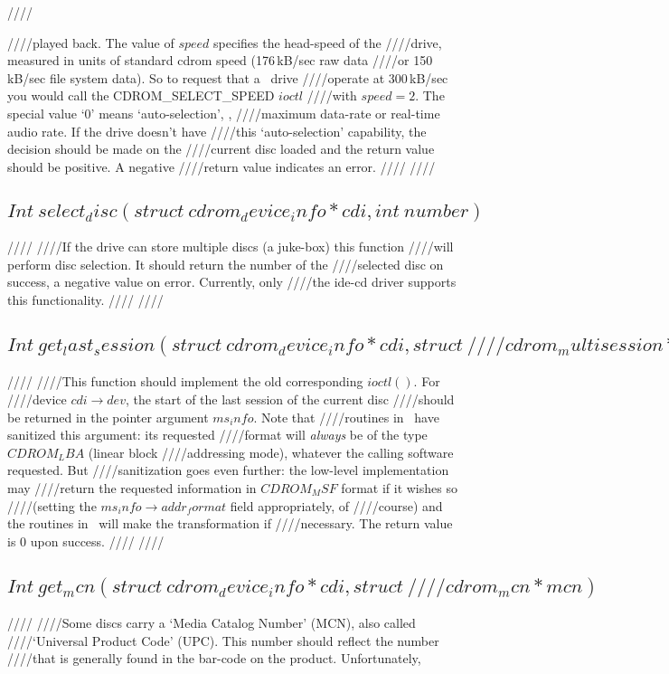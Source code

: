 ////\documentclass{article}
\begin{document}
////played back. The value of $speed$ specifies the head-speed of the
////drive, measured in units of standard cdrom speed (176\,kB/sec raw data
////or 150\,kB/sec file system data). So to request that a \cdrom\ drive
////operate at 300\,kB/sec you would call the CDROM_SELECT_SPEED $ioctl$
////with $speed=2$. The special value `0' means `auto-selection', \ie,
////maximum data-rate or real-time audio rate. If the drive doesn't have
////this `auto-selection' capability, the decision should be made on the
////current disc loaded and the return value should be positive. A negative
////return value indicates an error.
////
////\subsection{$Int\ select_disc(struct\ cdrom_device_info * cdi, int\ number)$}
////
////If the drive can store multiple discs (a juke-box) this function
////will perform disc selection. It should return the number of the
////selected disc on success, a negative value on error. Currently, only
////the ide-cd driver supports this functionality.
////
////\subsection{$Int\ get_last_session(struct\ cdrom_device_info * cdi, struct\
////  cdrom_multisession * ms_info)$}
////
////This function should implement the old corresponding $ioctl()$. For
////device $cdi\to dev$, the start of the last session of the current disc
////should be returned in the pointer argument $ms_info$. Note that
////routines in \cdromc\ have sanitized this argument: its requested
////format will {\em always\/} be of the type $CDROM_LBA$ (linear block
////addressing mode), whatever the calling software requested. But
////sanitization goes even further: the low-level implementation may
////return the requested information in $CDROM_MSF$ format if it wishes so
////(setting the $ms_info\rightarrow addr_format$ field appropriately, of
////course) and the routines in \cdromc\ will make the transformation if
////necessary. The return value is 0 upon success.
////
////\subsection{$Int\ get_mcn(struct\ cdrom_device_info * cdi, struct\
////  cdrom_mcn * mcn)$}
////
////Some discs carry a `Media Catalog Number' (MCN), also called
////`Universal Product Code' (UPC). This number should reflect the number
////that is generally found in the bar-code on the product. Unfortunately,
\end{document}
